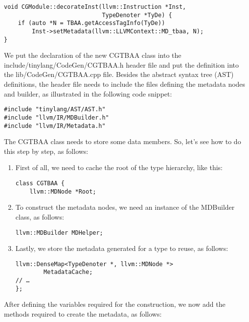 \begin{lstlisting}[caption={}]
void CGModule::decorateInst(llvm::Instruction *Inst,
							TypeDenoter *TyDe) {
	if (auto *N = TBAA.getAccessTagInfo(TyDe))
		Inst->setMetadata(llvm::LLVMContext::MD_tbaa, N);
}
\end{lstlisting}

We put the declaration of the new CGTBAA class into the include/tinylang/CodeGen/CGTBAA.h header file and put the definition into the lib/CodeGen/CGTBAA.cpp file. Besides the abstract syntax tree (AST) definitions, the header file needs to include the files defining the metadata nodes and builder, as illustrated in the following code snippet:\par

\begin{lstlisting}[caption={}]
#include "tinylang/AST/AST.h"
#include "llvm/IR/MDBuilder.h"
#include "llvm/IR/Metadata.h"
\end{lstlisting}

The CGTBAA class needs to store some data members. So, let's see how to do this step by step, as follows:\par

\begin{enumerate}
\item First of all, we need to cache the root of the type hierarchy, like this:
\begin{lstlisting}[caption={}]
class CGTBAA {
	llvm::MDNode *Root;
\end{lstlisting}

\item To construct the metadata nodes, we need an instance of the MDBuilder class, as follows:
\begin{lstlisting}[caption={}]
 	llvm::MDBuilder MDHelper;
\end{lstlisting}

\item Lastly, we store the metadata generated for a type to reuse, as follows:
\begin{lstlisting}[caption={}]
	llvm::DenseMap<TypeDenoter *, llvm::MDNode *> 
		MetadataCache;
// …
};
\end{lstlisting}
\end{enumerate}

After defining the variables required for the construction, we now add the methods required to create the metadata, as follows:\par


